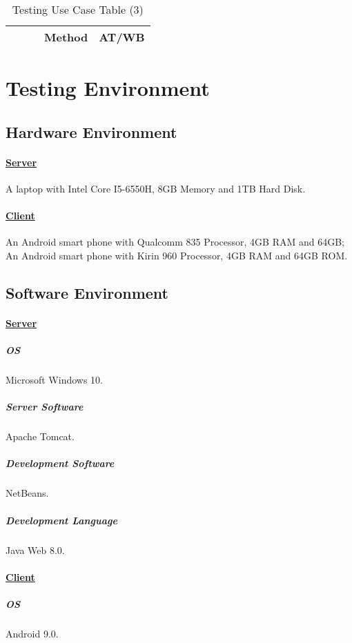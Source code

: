 \documentclass[10pt]{article}
\begin{document}
\begin{table}[htb]
\begin{tabular}{|c|c|c|c|c|}
															 &                            &                                                            & Method   & AT/WB                                                                                                                                                                                                                                                                   \\ \hline
	\end{tabular}
	\caption{Testing Use Case Table (3)}
	\label{Testing Use Case Table (3)}
	\end{table}

	\newpage

	\section{Testing Environment}
	\subsection{Hardware Environment}
	\paragraph{\underline{Server}}
	A laptop with Intel Core I5-6550H, 8GB Memory and 1TB Hard Disk.

	\paragraph{\underline{Client}}An Android smart phone with Qualcomm 835 Processor, 4GB RAM and 64GB; An Android smart phone with Kirin 960 Processor, 4GB RAM and 64GB ROM.

	\subsection{Software Environment}
	\paragraph{\underline{Server}}
	\subparagraph{OS} Microsoft Windows 10.
	\subparagraph{Server Software} Apache Tomcat.
	\subparagraph{Development Software} NetBeans.
	\subparagraph{Development Language} Java Web 8.0.

	\paragraph{\underline{Client}}
	\subparagraph{OS} Android 9.0.
\end{document}
